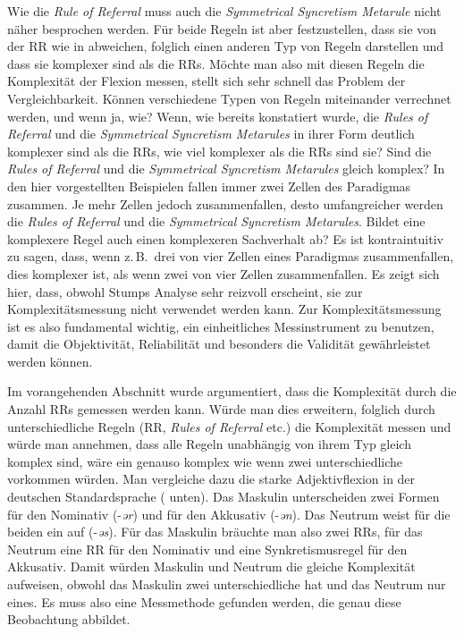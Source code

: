 \begin{exe}
\begin{exe}
Wie die \textit{Rule of Referral} muss auch die \textit{Symmetrical Syncretism Metarule} nicht näher besprochen werden. Für beide Regeln ist aber festzustellen, dass sie von der RR wie in  abweichen, folglich einen anderen Typ von Regeln darstellen und dass sie komplexer sind als die RRs. Möchte man also mit diesen Regeln die Komplexität der Flexion messen, stellt sich sehr schnell das Problem der Vergleichbarkeit. Können verschiedene Typen von Regeln miteinander verrechnet werden, und wenn ja, wie? Wenn, wie bereits konstatiert wurde, die \textit{Rules of Referral} und die \textit{Symmetrical Syncretism Metarules} in ihrer Form deutlich komplexer sind als die RRs, wie viel komplexer als die RRs sind sie? Sind die \textit{Rules of Referral} und die \textit{Symmetrical Syncretism Metarules} gleich komplex? In den hier vorgestellten Beispielen fallen immer zwei Zellen des Paradigmas zusammen. Je mehr Zellen jedoch zusammenfallen, desto umfangreicher werden die \textit{Rules of Referral} und die \textit{Symmetrical Syncretism Metarules}. Bildet eine komplexere Regel auch einen komplexeren Sachverhalt ab? Es ist kontraintuitiv zu sagen, dass, wenn z.\,B.\ drei von vier Zellen eines Paradigmas zusammenfallen, dies komplexer ist, als wenn zwei von vier Zellen zusammenfallen. Es zeigt sich hier, dass, obwohl Stumps Analyse sehr reizvoll erscheint, sie zur Komplexitätsmessung nicht verwendet werden kann. Zur Komplexitätsmessung ist es also fundamental wichtig, ein einheitliches Messinstrument zu benutzen, damit die Objektivität, Reliabilität und besonders die Validität gewährleistet werden können.

Im vorangehenden Abschnitt  wurde argumentiert, dass die Komplexität durch die Anzahl RRs gemessen werden kann. Würde man dies erweitern, folglich durch unterschiedliche Regeln (RR, \textit{Rules of Referral} etc.) die Komplexität messen und würde man annehmen, dass alle Regeln unabhängig von ihrem Typ gleich komplex sind, wäre ein  genauso komplex wie wenn zwei unterschiedliche  vorkommen würden. Man vergleiche dazu die starke Adjektivflexion in der deutschen Standardsprache ( unten). Das Maskulin unterscheiden zwei Formen für den Nominativ (-\textit{ər}) und für den Akkusativ (-\textit{ən}). Das Neutrum weist für die beiden  ein  auf (-\textit{əs}). Für das Maskulin bräuchte man also zwei RRs, für das Neutrum eine RR für den Nominativ und eine Synkretismusregel für den Akkusativ. Damit würden Maskulin und Neutrum die gleiche Komplexität aufweisen, obwohl das Maskulin zwei unterschiedliche  hat und das Neutrum nur eines. Es muss also eine Messmethode gefunden werden, die genau diese Beobachtung abbildet.\\


\end{exe}
\end{exe}
